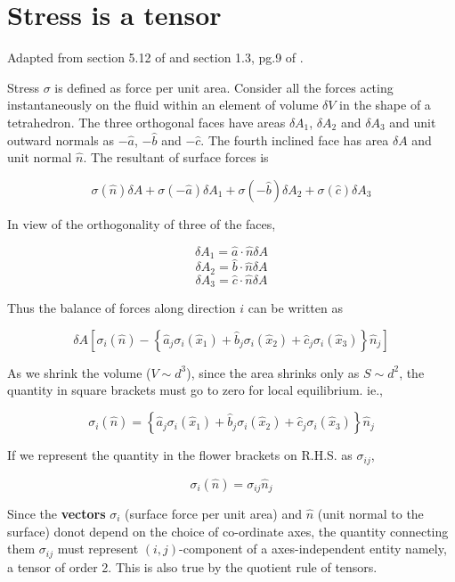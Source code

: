 \section{Stress is a tensor}
\label{stresstensor}

Adapted from section 5.12 of \cite{aris} and section 1.3, pg.9 of \cite{batchelor}.

Stress $\sigma$ is defined as force per unit area. Consider all the forces acting instantaneously on the fluid within an element of volume $\delta V$ in the shape of a tetrahedron. The three orthogonal faces have areas $\delta A_1$, $\delta A_2$ and $\delta A_3$ and unit outward normals as $-\hat{a}$, $-\hat{b}$ and $-\hat{c}$. The fourth inclined face has area $\delta A$ and unit normal $\hat{n}$. The resultant of surface forces is 

$$ \sigma(\hat{n}) \delta A +  \sigma(-\hat{a}) \delta A_1 +  \sigma(-\hat{b}) \delta A_2 +  \sigma(\hat{c}) \delta A_3$$

In view of the orthogonality of three of the faces, 

$$ \delta A_1 = \hat{a} \cdot \hat{n} \delta A $$
$$ \delta A_2 = \hat{b} \cdot \hat{n} \delta A $$
$$ \delta A_3 = \hat{c} \cdot \hat{n} \delta A $$

Thus the balance of forces along direction $i$ can be written as

$$ \delta A \left[ \sigma_i(\hat{n}) - \left\{ \hat{a}_j \sigma_i(\hat{x}_1) +  \hat{b}_j \sigma_i(\hat{x}_2) +  \hat{c}_j \sigma_i(\hat{x}_3) \right\} \hat{n}_j \right] $$

As we shrink the volume ($V \sim d^3$), since the area shrinks only as $S \sim d^2$, the quantity in square brackets must go to zero for local equilibrium. ie.,

$$ \sigma_i(\hat{n}) =  \left\{ \hat{a}_j \sigma_i(\hat{x}_1) +  \hat{b}_j \sigma_i(\hat{x}_2) +  \hat{c}_j \sigma_i(\hat{x}_3) \right\} \hat{n}_j $$

If we represent the quantity in the flower brackets on R.H.S. as $\sigma_{ij}$,

$$ \sigma_i(\hat{n}) = \sigma_{ij} \hat{n}_j $$

Since the {\bf vectors} $\sigma_i$ (surface force per unit area) and $\hat{n}$ (unit normal to the surface) donot depend on the choice of co-ordinate axes, the quantity connecting them $\sigma_{ij}$ must represent $(i,j)$-component of a axes-independent entity namely, a tensor of order 2. This is also true by the quotient rule of tensors.


